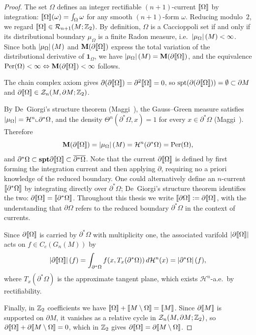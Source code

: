 \begin{proof}
The set $\Omega$ defines an integer rectifiable $(n{+}1)$-current $\llbracket \Omega \rrbracket$ by integration: $\llbracket \Omega \rrbracket(\omega) = \int_\Omega \omega$ for any smooth $(n{+}1)$-form $\omega$. Reducing modulo~$2$, we regard $\llbracket \Omega \rrbracket \in \mathcal{R}_{n+1}(M; \mathbb{Z}_2)$. By definition, $\Omega$ is a Caccioppoli set if and only if its distributional boundary $\mu_\Omega$ is a finite Radon measure, i.e.\ $\left| \mu_\Omega \right|(M) < \infty$. Since both $\left| \mu_\Omega \right|(M)$ and $\mathbf{M}{(\partial\llbracket \Omega \rrbracket)}$ express the total variation of the distributional derivative of $\mathbf{1}_\Omega$, we have $\left| \mu_\Omega \right|(M) = \mathbf{M}{(\partial\llbracket \Omega \rrbracket)}$, and the equivalence $\mathrm{Per}(\Omega) < \infty \Leftrightarrow \mathbf{M}{(\partial\llbracket \Omega \rrbracket)} < \infty$ follows.

The chain complex axiom gives $\partial(\partial\llbracket \Omega \rrbracket) = \partial^2\llbracket \Omega \rrbracket = 0$, so $\mathrm{spt}(\partial(\partial\llbracket \Omega \rrbracket)) = \emptyset \subset \partial M$ and $\partial\llbracket \Omega \rrbracket \in \mathcal{Z}_n(M, \partial M; \mathbb{Z}_2)$.

By De~Giorgi's structure theorem (Maggi~\cite[Theorem~15.9]{Mag12}), the Gauss--Green measure satisfies $\left| \mu_\Omega \right| = \mathcal{H}^n \llcorner \partial^*\Omega$, and the density $\Theta^n(\partial^*\Omega, x) = 1$ for every $x \in \partial^*\Omega$ (Maggi~\cite[Corollary~15.8]{Mag12}). Therefore
\[
\mathbf{M}{(\partial\llbracket \Omega \rrbracket)} = \left| \mu_\Omega \right|(M) = \mathcal{H}^n(\partial^*\Omega) = \mathrm{Per}(\Omega),
\]
and $\partial^*\Omega \subset \mathbf{spt}{\partial\llbracket \Omega \rrbracket} \subset \overline{\partial^*\Omega}$. Note that the current $\partial\llbracket \Omega \rrbracket$ is defined by first forming the integration current and then applying $\partial$, requiring no a priori knowledge of the reduced boundary. One could alternatively define an $n$-current $\llbracket \partial^*\Omega \rrbracket$ by integrating directly over $\partial^*\Omega$; De~Giorgi's structure theorem identifies the two: $\partial\llbracket \Omega \rrbracket = \llbracket \partial^*\Omega \rrbracket$. Throughout this thesis we write $\llbracket\partial\Omega\rrbracket := \partial\llbracket \Omega \rrbracket$, with the understanding that $\partial\Omega$ refers to the reduced boundary $\partial^*\Omega$ in the context of currents.

Since $\partial\llbracket \Omega \rrbracket$ is carried by $\partial^*\Omega$ with multiplicity one, the associated varifold $\left| \partial\llbracket \Omega \rrbracket \right|$ acts on $f \in C_c(G_n(M))$ by
\[
\left| \partial\llbracket \Omega \rrbracket \right|(f) = \int_{\partial^*\Omega} f(x, T_x(\partial^*\Omega)) \, d\mathcal{H}^n(x) = \left| \partial^*\Omega \right|(f),
\]
where $T_x(\partial^*\Omega)$ is the approximate tangent plane, which exists $\mathcal{H}^n$-a.e.\ by rectifiability.

Finally, in $\mathbb{Z}_2$ coefficients we have $\llbracket \Omega \rrbracket + \llbracket M \setminus \Omega \rrbracket = \llbracket M \rrbracket$. Since $\partial\llbracket M \rrbracket$ is supported on $\partial M$, it vanishes as a relative cycle in $\mathcal{Z}_{n}(M, \partial M; \mathbb{Z}_2)$, so $\partial\llbracket \Omega \rrbracket + \partial\llbracket M \setminus \Omega \rrbracket = 0$, which in $\mathbb{Z}_2$ gives $\partial\llbracket \Omega \rrbracket = \partial\llbracket M \setminus \Omega \rrbracket$.
\end{proof}

